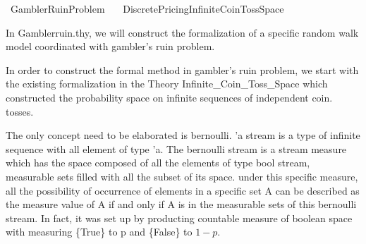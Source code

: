 %
\begin{isabellebody}%
%
%
\isadelimtheory
%
\endisadelimtheory
%
\isatagtheory
{}\isamarkupfalse%
\ Gambler{\isacharunderscore}{\kern0pt}Ruin{\isacharunderscore}{\kern0pt}Problem\isanewline
\ \ \ DiscretePricing{\isachardot}{\kern0pt}Infinite{\isacharunderscore}{\kern0pt}Coin{\isacharunderscore}{\kern0pt}Toss{\isacharunderscore}{\kern0pt}Space\isanewline
\isanewline
{}%
\endisatagtheory
{\isafoldtheory}%
%
\isadelimtheory
%
\endisadelimtheory
%
\isadelimdocument
%
\endisadelimdocument
%
\isatagdocument
%
\isamarkuptrue%
%
\endisatagdocument
{\isafolddocument}%
%
\isadelimdocument
%
\endisadelimdocument
%
\begin{isamarkuptext}%
In Gamblerruin.thy, we will construct the formalization of a specific random walk model coordinated with gambler's ruin problem.%
\end{isamarkuptext}\isamarkuptrue%
%
\isadelimdocument
%
\endisadelimdocument
%
\isatagdocument
%
\isamarkuptrue%
%
\endisatagdocument
{\isafolddocument}%
%
\isadelimdocument
%
\endisadelimdocument
%
\begin{isamarkuptext}%
In order to construct the formal method in gambler's ruin problem, we start with the existing 
formalization in the Theory Infinite{\_}Coin{\_}Toss{\_}Space which constructed the probability space 
on infinite sequences of independent coin.
tosses.%
\end{isamarkuptext}\isamarkuptrue%
%
\begin{isamarkuptext}%
The only concept need to be elaborated is bernoulli. 'a stream is a type of infinite sequence with all 
element of type 'a. The bernoulli stream is a stream measure which has the space composed of all the 
elements of type bool stream, measurable sets filled with all the subset of its space. under this 
specific measure, all the possibility of occurrence of elements in a specific set A can be described 
as the measure value of A if and only if A is in the measurable sets of this bernoulli stream. In fact, 
it was set up by producting countable measure of boolean space with measuring \{True\} to p and \{False\} 
to $1-p$.%
\end{isamarkuptext}\isamarkuptrue%
%
\isadelimdocument
%
\endisadelimdocument
%
\isatagdocument
%
\end{isabellebody}
